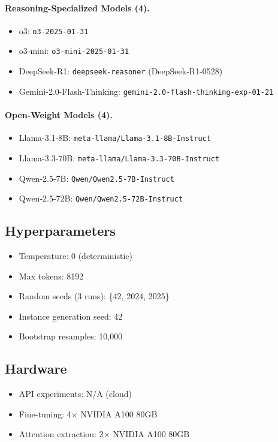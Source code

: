\documentclass{article}
\theoremstyle{plain}
\theoremstyle{definition}
\theoremstyle{remark}
\begin{document}
\paragraph{Reasoning-Specialized Models (4).}
\begin{itemize}
\item o3: \texttt{o3-2025-01-31}
\item o3-mini: \texttt{o3-mini-2025-01-31}
\item DeepSeek-R1: \texttt{deepseek-reasoner} (DeepSeek-R1-0528)
\item Gemini-2.0-Flash-Thinking: \texttt{gemini-2.0-flash-thinking-exp-01-21}
\end{itemize}

\paragraph{Open-Weight Models (4).}
\begin{itemize}
\item Llama-3.1-8B: \texttt{meta-llama/Llama-3.1-8B-Instruct}
\item Llama-3.3-70B: \texttt{meta-llama/Llama-3.3-70B-Instruct}
\item Qwen-2.5-7B: \texttt{Qwen/Qwen2.5-7B-Instruct}
\item Qwen-2.5-72B: \texttt{Qwen/Qwen2.5-72B-Instruct}
\end{itemize}

\subsection{Hyperparameters}
\begin{itemize}
\item Temperature: 0 (deterministic)
\item Max tokens: 8192
\item Random seeds (3 runs): \{42, 2024, 2025\}
\item Instance generation seed: 42
\item Bootstrap resamples: 10,000
\end{itemize}

\subsection{Hardware}
\begin{itemize}
\item API experiments: N/A (cloud)
\item Fine-tuning: 4$\times$ NVIDIA A100 80GB
\item Attention extraction: 2$\times$ NVIDIA A100 80GB
\end{itemize}
\end{document}
